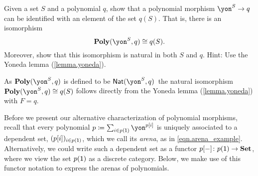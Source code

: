 \documentclass[Book-Poly]{subfiles}
\begin{document}
\begin{exercise} \label{exc.poly_morph_yoneda}
Given a set $S$ and a polynomial $q$, show that a polynomial morphism $\yon^S \to q$ can be identified with an element of the set $q(S)$.
That is, there is an isomorphism
\[
    \poly(\yon^S, q) \iso q(S).
\]
Moreover, show that this isomorphism is natural in both $S$ and $q$.
Hint: Use the Yoneda lemma (\cref{lemma.yoneda}).
\begin{solution}
As $\poly(\yon^S, q)$ is defined to be $\nat(\yon^S, q)$\, the natural isomorphism $\poly(\yon^S, q) \iso q(S)$ follows directly from the Yoneda lemma (\cref{lemma.yoneda}) with $F = q$.
\end{solution}
\end{exercise}

Before we present our alternative characterization of polynomial morphisms, recall that every polynomial $p \coloneqq \sum_{i \in p(\1)} \yon^{p[i]}$ is uniquely associated to a dependent set, $(p[i])_{i \in p(\textsf{1})}$, which we call its \emph{arena}, as in \eqref{eqn.arena_example}.
Alternatively, we could write such a dependent set as a functor $p[-] \colon p(\textsf{1}) \to \mathbf{Set}$, where we view the set $p(\textsf{1})$ as a discrete category.
Below, we make use of this functor notation to express the arenas of polynomials.
\end{document}
